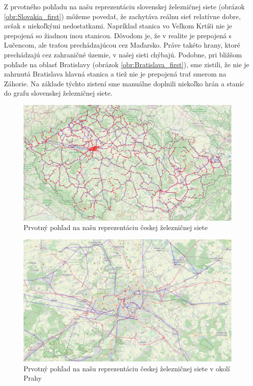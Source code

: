 \documentclass[main.tex]{subfiles}
\begin{document}
Z prvotného pohľadu na našu reprezentáciu slovenskej železničnej siete (obrázok \ref{obr:Slovakia_first}) môžeme povedať, že zachytáva reálnu sieť relatívne dobre, avšak s niekoľkými nedostatkami. Napríklad stanica vo Veľkom Krtíši nie je prepojená so žiadnou inou stanicou. Dôvodom je, že v realite je prepojená s Lučencom, ale traťou prechádzajúcou cez Maďarsko. Práve takéto hrany, ktoré prechádzajú cez zahraničné územie, v našej sieti chýbajú. Podobne, pri bližšom pohľade na oblasť Bratislavy (obrázok \ref{obr:Bratislava_first}), sme zistili, že nie je zahrnutá Bratislava hlavná stanica a tiež nie je prepojená trať smerom na Záhorie. Na základe týchto zistení sme manuálne doplnili niekoľko hrán a staníc do grafu slovenskej železničnej siete.

\begin{figure}
\centerline{\includegraphics[width=1.2\textwidth]{images/first_attempt_czechia.png}}
\caption{Prvotný pohľad na našu reprezentáciu českej železničnej siete}
\label{obr:Czechia_first}
\end{figure}

\begin{figure}
\centerline{\includegraphics[width=1.2\textwidth]{images/first_attempt_praha.png}}
\caption{Prvotný pohľad na našu reprezentáciu českej železničnej siete v okolí Prahy}
\label{obr:Praha_first}
\end{figure}
\end{document}
